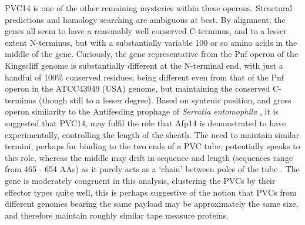 PVC14 is one of the other remaining mysteries within these operons. Structural predictions and homology searching are ambiguous at best. By alignment, the genes all seem to have a reasonably well conserved C-terminus, and to a lesser extent N-terminus, but with a substantially variable 100 or so amino acids in the middle of the gene. Curiously, the gene representative from the Pnf operon of the Kingscliff genome is substantially different at the N-terminal end, with just a handful of 100\% conserved residues; being different even from that of the Pnf operon in the ATCC43949 (USA) genome, but maintaining the conserved C-terminus (though still to a lesser degree). Based on syntenic position, and gross operon similarity to the Antifeeding prophage of \emph{Serratia entomophila} \citep{Heymann2013}, it is suggested that PVC14, may fulfil the role that Afp14 is demonstrated to have experimentally, controlling the length of the sheath. The need to maintain similar termini, perhaps for binding to the two ends of a PVC tube, potentially speaks to this role, whereas the middle may drift in sequence and length (sequences range from 465 - 654 AAs) as it purely acts as a `chain' between poles of the tube \citep{Rybakova2015}. The gene is moderately congruent in this analysis, clustering the PVCs by their effector types quite well, this is perhaps suggestive of the notion that PVCs from different genomes bearing the same payload may be approximately the same size, and therefore maintain roughly similar tape measure proteins.
 
